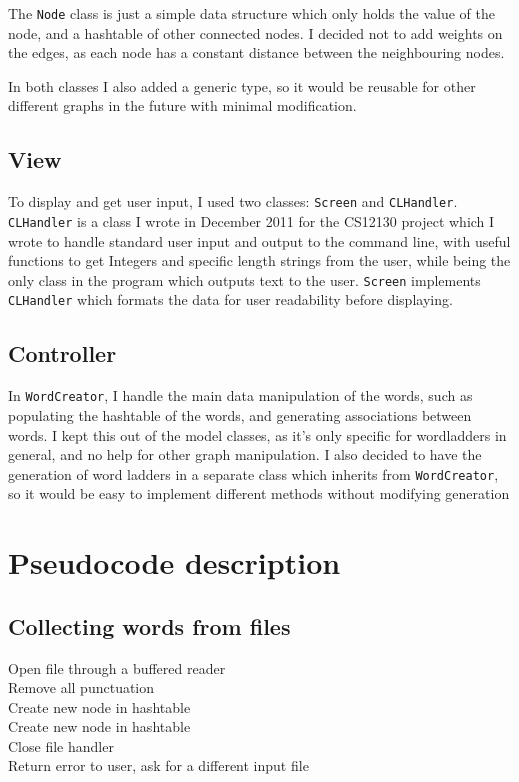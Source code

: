\documentclass[10pt, a4paper]{article}
\begin{document}
The \texttt{Node} class is just a simple data structure which only holds the value of the node, and a hashtable of other connected nodes. I decided not to add weights on the edges, as each node has a constant distance between the neighbouring nodes.

In both classes I also added a generic type, so it would be reusable for other different graphs in the future with minimal modification. 

\subsection{View}

To display and get user input, I used two classes: \texttt{Screen} and \texttt{CLHandler}. \texttt{CLHandler} is a class I wrote in December 2011 for the CS12130 project which I wrote to handle standard user input and output to the command line, with useful functions to get Integers and specific length strings from the user, while being the only class in the program which outputs text to the user. \texttt{Screen} implements \texttt{CLHandler} which formats the data for user readability before displaying. 

\subsection{Controller}

In \texttt{WordCreator}, I handle the main data manipulation of the words, such as populating the hashtable of the words, and generating associations between words. I kept this out of the model classes, as it’s only specific for wordladders in general, and no help for other graph manipulation. I also decided to have the generation of word ladders in a separate class which inherits from \texttt{WordCreator}, so it would be easy to implement different methods without modifying generation


\section{Pseudocode description}

\subsection{Collecting words from files}

\begin{algorithm}[H]
\SetAlgoLined
	 {
		Open file through a buffered reader \\
		 {
			Remove all punctuation \\
			 {
				Create new node in hashtable \\
			} {
				 {
					Create new node in hashtable\\
				}
			}
		}
		Close file handler\\
	} {
		Return error to user, ask for a different input file\\
	}

\end{algorithm}
\end{document}
